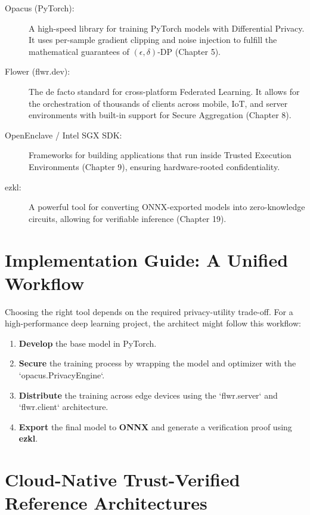 \begin{description}
  \item[Opacus (PyTorch):] 
        A high-speed library for training PyTorch models with Differential Privacy. It uses per-sample gradient clipping and noise injection to fulfill the mathematical guarantees of $(\epsilon, \delta)$-DP (Chapter 5).
  \item[Flower (flwr.dev):]
        The de facto standard for cross-platform Federated Learning. It allows for the orchestration of thousands of clients across mobile, IoT, and server environments with built-in support for Secure Aggregation (Chapter 8).
  \item[OpenEnclave / Intel SGX SDK:]
        Frameworks for building applications that run inside Trusted Execution Environments (Chapter 9), ensuring hardware-rooted confidentiality.
  \item[ezkl:]
        A powerful tool for converting ONNX-exported models into zero-knowledge circuits, allowing for verifiable inference (Chapter 19).
\end{description}

\section{Implementation Guide: A Unified Workflow}
\label{sec:implementation_workflow}

Choosing the right tool depends on the required privacy-utility trade-off. For a high-performance deep learning project, the architect might follow this workflow:

\begin{enumerate}
    \item \textbf{Develop} the base model in PyTorch.
    \item \textbf{Secure} the training process by wrapping the model and optimizer with the `opacus.PrivacyEngine`.
    \item \textbf{Distribute} the training across edge devices using the `flwr.server` and `flwr.client` architecture.
    \item \textbf{Export} the final model to \textbf{ONNX} and generate a verification proof using \textbf{ezkl}.
\end{enumerate}

\section{Cloud-Native Trust-Verified Reference Architectures}
\label{sec:cloud_architectures}

